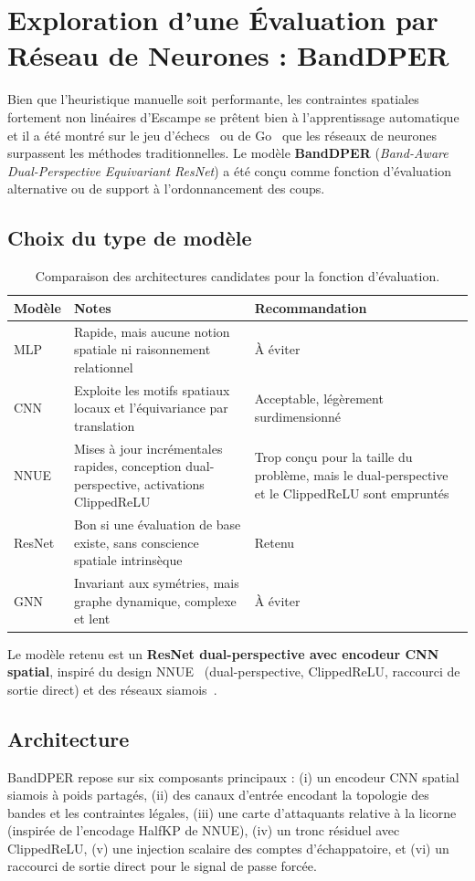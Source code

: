 \documentclass[12pt,a4paper]{article}
\begin{document}
\section{Exploration d'une Évaluation par Réseau de Neurones : BandDPER}
Bien que l'heuristique manuelle soit performante, les contraintes spatiales fortement non linéaires d'Escampe se prêtent bien à l'apprentissage automatique et il a été montré sur le jeu d'échecs~\cite{cp_nnue} ou de Go~\cite{alphazero} que les réseaux de neurones surpassent les méthodes traditionnelles.
Le modèle \textbf{BandDPER} (\textit{Band-Aware Dual-Perspective Equivariant ResNet}) a été conçu comme fonction d'évaluation alternative ou de support à l'ordonnancement des coups.


\subsection*{Choix du type de modèle}
\begin{table}[H]
\centering
\begin{tabular}{p{1.8cm} p{6.5cm} p{4.5cm}}
\toprule
Modèle & Notes & Recommandation \\
\midrule
MLP & Rapide, mais aucune notion spatiale ni raisonnement relationnel & À éviter \\
CNN & Exploite les motifs spatiaux locaux et l'équivariance par translation & Acceptable, légèrement surdimensionné \\
NNUE & Mises à jour incrémentales rapides, conception dual-perspective, activations ClippedReLU & Trop conçu pour la taille du problème, mais le dual-perspective et le ClippedReLU sont empruntés \\
ResNet & Bon si une évaluation de base existe, sans conscience spatiale intrinsèque & Retenu \\
GNN & Invariant aux symétries, mais graphe dynamique, complexe et lent & À éviter \\
\bottomrule
\end{tabular}
\caption{Comparaison des architectures candidates pour la fonction d'évaluation.}
\label{tab-existing-models}
\end{table}

Le modèle retenu est un \textbf{ResNet dual-perspective avec encodeur CNN spatial}, inspiré du design NNUE~\cite{cp_nnue} (dual-perspective, ClippedReLU, raccourci de sortie direct) et des réseaux siamois~\cite{bromley1993}.


\subsection*{Architecture}
BandDPER repose sur six composants principaux : (i) un encodeur CNN spatial siamois à poids partagés, (ii) des canaux d'entrée encodant la topologie des bandes et les contraintes légales, (iii) une carte d'attaquants relative à la licorne (inspirée de l'encodage HalfKP de NNUE), (iv) un tronc résiduel avec ClippedReLU, (v) une injection scalaire des comptes d'échappatoire, et (vi) un raccourci de sortie direct pour le signal de passe forcée.
\end{document}
